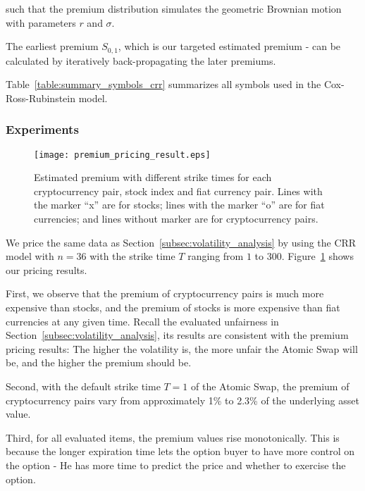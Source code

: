 such that the premium distribution simulates the geometric Brownian motion  with parameters $r$ and $\sigma$.

The earliest premium $S_{0, 1}$, which is our targeted estimated premium - can be calculated by iteratively back-propagating the later premiums.

Table~\ref{table:summary_symbols_crr} summarizes all symbols used in the Cox-Ross-Rubinstein model. 

\subsubsection{Experiments}

\begin{figure}
    \texttt{[image: premium\_pricing\_result.eps]}
    \caption{Estimated premium with different strike times for each cryptocurrency pair, stock index and fiat currency pair. Lines with the marker ``x'' are for stocks; lines with the marker ``o'' are for fiat currencies; and lines without marker are for cryptocurrency pairs.}
    \label{fig:premium_pricing_result}
\end{figure}

We price the same data as Section~\ref{subsec:volatility_analysis} by using the CRR model with $n = 36$ with the strike time $T$ ranging from $1$ to $300$.
Figure~\ref{fig:premium_pricing_result} shows our pricing results.

First, we observe that the premium of cryptocurrency pairs is much more expensive than stocks, and the premium of stocks is more expensive than fiat currencies at any given time.
Recall the evaluated unfairness in Section~\ref{subsec:volatility_analysis}, its results are consistent with the premium pricing results: The higher the volatility is, the more unfair the Atomic Swap will be, and the higher the premium should be.

Second, with the default strike time $T = 1$ of the Atomic Swap, the premium of cryptocurrency pairs vary from approximately 1\% to 2.3\% of the underlying asset value.

Third, for all evaluated items, the premium values rise monotonically.
This is because the longer expiration time lets the option buyer to have more control on the option - He has more time to predict the price and  whether to exercise the option.